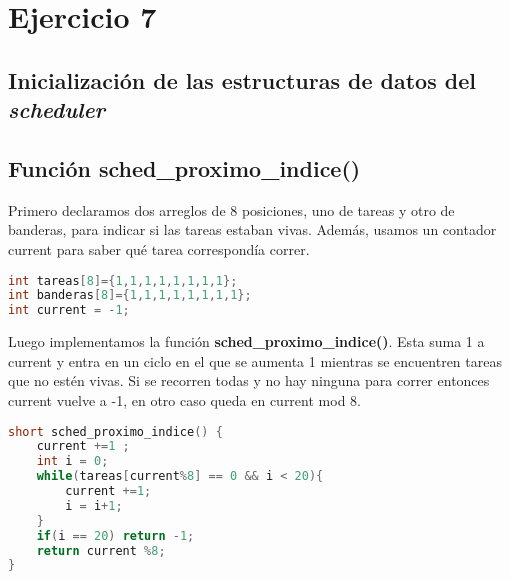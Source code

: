 \section{Ejercicio 7}
\par{}

\subsection*{Inicialización de las estructuras de datos del \textit{scheduler}}
\par{}


\subsection*{Función sched\_proximo\_indice()}
\par{Primero declaramos dos arreglos de 8 posiciones, uno de tareas y otro de banderas, para indicar si las tareas estaban vivas. Además, usamos un contador current para saber qué tarea correspondía correr.}
\begin{lstlisting}[language={C}]
int tareas[8]={1,1,1,1,1,1,1,1};
int banderas[8]={1,1,1,1,1,1,1,1};
int current = -1;
\end{lstlisting}

\par{Luego implementamos la función \textbf{sched\_proximo\_indice()}. Esta suma 1 a current y entra en un ciclo en el que se aumenta 1 mientras se encuentren tareas que no estén vivas. Si se recorren todas y no hay ninguna para correr entonces current vuelve a -1, en otro caso queda en current mod 8.}
\begin{lstlisting}[language={C}]
short sched_proximo_indice() {
	current +=1 ;
	int i = 0;
	while(tareas[current%8] == 0 && i < 20){
		current +=1;
		i = i+1;
	}
	if(i == 20) return -1;
	return current %8;
}
\end{lstlisting}

\clearpage